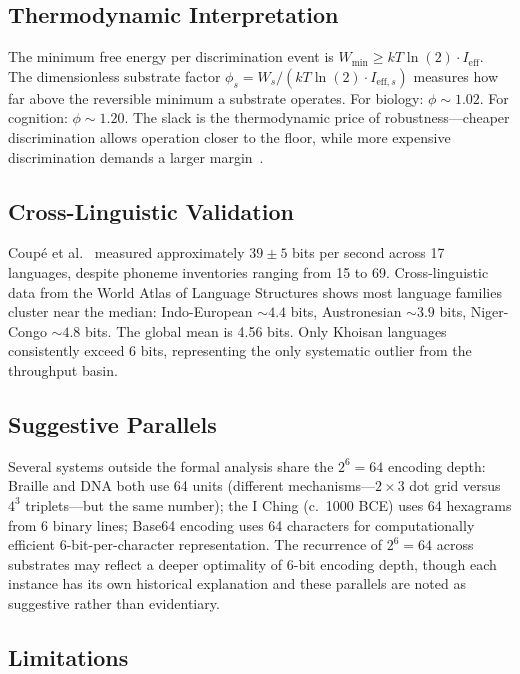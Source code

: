 \documentclass[11pt]{article}
\begin{document}
\subsection{Thermodynamic Interpretation}

The minimum free energy per discrimination event is $W_{\min} \geq kT \ln(2) \cdot I_{\mathrm{eff}}$. The dimensionless substrate factor $\phi_s = W_s / (kT \ln(2) \cdot I_{\mathrm{eff},s})$ measures how far above the reversible minimum a substrate operates. For biology: $\phi \sim 1.02$. For cognition: $\phi \sim 1.20$. The slack is the thermodynamic price of robustness---cheaper discrimination allows operation closer to the floor, while more expensive discrimination demands a larger margin~\cite{hopfield1974}.

\subsection{Cross-Linguistic Validation}

Coup\'{e} et al.~\cite{coupe2019} measured approximately $39 \pm 5$ bits per second across 17 languages, despite phoneme inventories ranging from 15 to 69. Cross-linguistic data from the World Atlas of Language Structures shows most language families cluster near the median: Indo-European $\sim 4.4$ bits, Austronesian $\sim 3.9$ bits, Niger-Congo $\sim 4.8$ bits. The global mean is 4.56 bits. Only Khoisan languages consistently exceed 6 bits, representing the only systematic outlier from the throughput basin.

\subsection{Suggestive Parallels}

Several systems outside the formal analysis share the $2^6 = 64$ encoding depth: Braille and DNA both use 64 units (different mechanisms---$2 \times 3$ dot grid versus $4^3$ triplets---but the same number); the I Ching (c.\ 1000 BCE) uses 64 hexagrams from 6 binary lines; Base64 encoding uses 64 characters for computationally efficient 6-bit-per-character representation. The recurrence of $2^6 = 64$ across substrates may reflect a deeper optimality of 6-bit encoding depth, though each instance has its own historical explanation and these parallels are noted as suggestive rather than evidentiary.

\subsection{Limitations}
\end{document}

